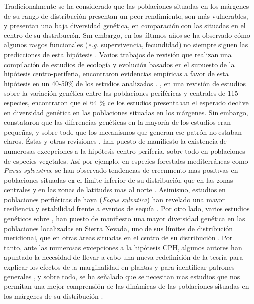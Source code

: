 Tradicionalmente se ha considerado que las poblaciones situadas en los márgenes de su rango de distribución presentan un peor rendimiento, son más vulnerables, y presentan una baja diversidad genética, en comparación con las situadas en el centro de su distribución. Sin embargo, en los últimos años se ha observado cómo algunos rasgos funcionales (\emph{e.g.} supervivencia, fecundidad) no siempre siguen las predicciones de esta hipótesis \autocite{Pirononetal2017GeographicVariation}. Varios trabajos de revisión que realizan una compilación de estudios de ecología y evolución basados en el supuesto de la hipótesis centro-periferia, encontraron evidencias empíricas a favor de esta hipótesis en un 40-50\% de los estudios analizados \autocites{SagarinGaines2002AbundantCentre,Pirononetal2017GeographicVariation}. \citet{Eckertetal2008GeneticVariation}, en una revisión de estudios sobre la variación genética entre las poblaciones periféricas y centrales de 115 especies, encontraron que el 64 \% de los estudios presentaban el esperado declive en diversidad genética en las poblaciones situadas en los márgenes. Sin embargo, constataron que las diferencias genéticas en la mayoría de los estudios eran pequeñas, y sobre todo que los mecanismos que generan ese patrón no estaban claros.  
Éstas y otras revisiones \autocite[\emph{e.g.}][]{Abelietal2014EffectsMarginality}, han puesto de manifiesto la existencia de numerosas excepciones a la hipótesis centro periferia, sobre todo en poblaciones de especies vegetales. Así por ejemplo, en especies forestales mediterráneas como \emph{Pinus sylvestris}, se han observado tendencias de crecimiento mas positivas en poblaciones situadas en el límite inferior de su distribución que en las zonas centrales y en las zonas de latitudes mas al norte \autocite{Matiasetal2017ContrastingGrowth}. Asimismo, estudios en poblaciones perfiéricas de haya (\emph{Fagus sylvatica}) han revelado una mayor resiliencia y estabilidad frente a eventos de sequía \autocite{VilaCabreraetal2019RefiningPredictions}. Por otro lado, varios estudios genéticos sobre \Qpy, han puesto de manifiesto una mayor diversidad genética en las poblaciones localizadas en Sierra Nevada, uno de sus límites de distribución meridional, que en otras áreas situadas en el centro de su distribución \autocites{ValbuenaCarabanaGil2013GeneticResilience, ValbuenaCarabanaGil2017CentenaryCoppicing}. Por tanto, ante las numerosas excepciones a la hipótesis CPH, algunos autores han apuntado la necesidad de llevar a cabo una nueva redefinición de la teoría para explicar los efectos de la marginalidad en plantas y para identificar patrones generales \autocite[][]{Abelietal2014EffectsMarginality}, y sobre todo, se ha señalado que se necesitan mas estudios que nos permitan una mejor comprensión de las dinámicas de las poblaciones situadas en los márgenes de su distribución \autocites{VilaCabreraetal2019RefiningPredictions,Jumpetal2010MonitoringManaging, HampeJump2011ClimateRelicts, Fadyetal2016EvolutionbasedApproach}. 

